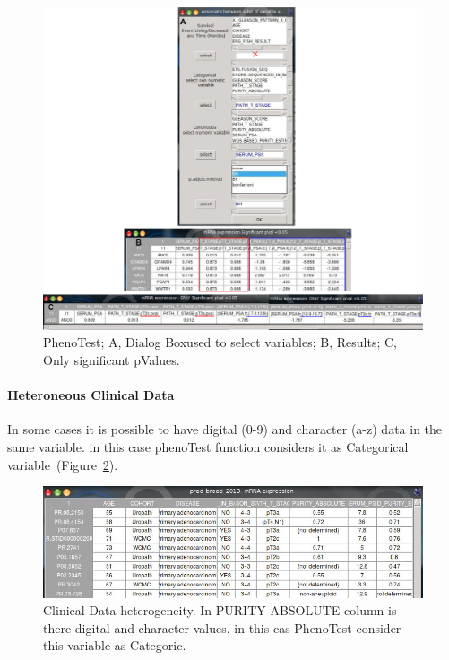 \documentclass[a4paper]{article}
\begin{document}
 \begin{figure}[!ht]
 \centering
\includegraphics[scale=2]{image/prad_broad-2013Results.png}
\caption{PhenoTest; A, Dialog Boxused to select variables; B, Results; C, Only significant pValues.}
\label{PhenoTestpradbroad}
\end{figure}

\paragraph{Heteroneous Clinical Data}
In some cases it is possible to have digital (0-9) and character (a-z) data  in the same variable. in this case phenoTest function considers it as Categorical variable~(Figure~\ref{heteroClinData}).

\begin{figure}[!ht]
 \centering
\includegraphics[scale=1]{image/heterogeneous1.jpeg}
\caption{Clinical Data heterogeneity. In PURITY ABSOLUTE column is there digital and character values. in this cas PhenoTest consider this variable as Categoric.}
\label{heteroClinData}
\end{figure}
\end{document}
